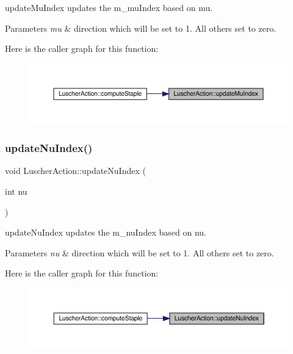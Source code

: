 update\+Mu\+Index updates the m\+\_\+mu\+Index based on mu. 


\begin{DoxyParams}{Parameters}
{\em mu} & direction which will be set to 1. All others set to zero. \\
\hline
\end{DoxyParams}
Here is the caller graph for this function\+:\nopagebreak
\begin{figure}[H]
\begin{center}
\leavevmode
\includegraphics[width=350pt]{class_luscher_action_a2bfa5f9b8bfb0c4440732000d2281519_icgraph}
\end{center}
\end{figure}
\mbox{\label{class_luscher_action_a6496c97ed38401c0d94855bf940fd6ff}} 
\subsubsection{\texorpdfstring{updateNuIndex()}{updateNuIndex()}}
{\footnotesize\ttfamily void Luscher\+Action\+::update\+Nu\+Index (\begin{DoxyParamCaption}\item[{int}]{nu }\end{DoxyParamCaption})\hspace{0.3cm}{\ttfamily [inline]}}



update\+Nu\+Index updates the m\+\_\+nu\+Index based on nu. 


\begin{DoxyParams}{Parameters}
{\em nu} & direction which will be set to 1. All others set to zero. \\
\hline
\end{DoxyParams}
Here is the caller graph for this function\+:\nopagebreak
\begin{figure}[H]
\begin{center}
\leavevmode
\includegraphics[width=350pt]{class_luscher_action_a6496c97ed38401c0d94855bf940fd6ff_icgraph}
\end{center}
\end{figure}


